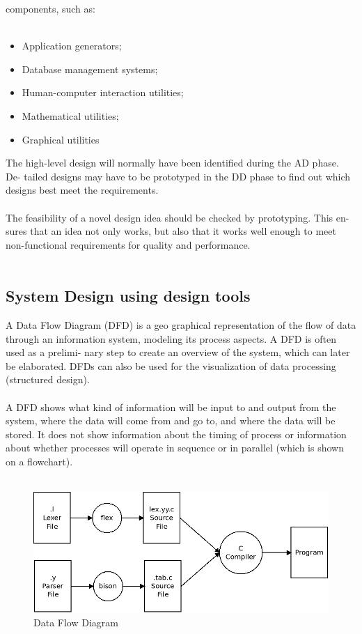 components, such as:\\\\
\begin{itemize}
\item Application generators;
\item Database management systems;
\item Human-computer interaction utilities;
\item Mathematical utilities;
\item Graphical utilities
\end{itemize}
The high-level design will normally have been identified during the AD phase. De-
tailed designs may have to be prototyped in the DD phase to find out which designs
best meet the requirements.\\\\
The feasibility of a novel design idea should be checked by prototyping. This en-
sures that an idea not only works, but also that it works well enough to meet
non-functional requirements for quality and performance.\\\\
\subsection{System Design using design tools}
A Data Flow Diagram (DFD) is a geo graphical representation of the flow of data through
an information system, modeling its process aspects. A DFD is often used as a prelimi-
nary step to create an overview of the system, which can later be elaborated. DFDs can
also be used for the visualization of data processing (structured design).\\\\
A DFD shows what kind of information will be input to and output from the system,
where the data will come from and go to, and where the data will be stored. It does not
show information about the timing of process or information about whether processes will
operate in sequence or in parallel (which is shown on a flowchart).\\\\
\begin{figure} [h]
\centering
\includegraphics[scale=0.5]{images/bison.png}
\caption{Data Flow Diagram}
\end{figure}
